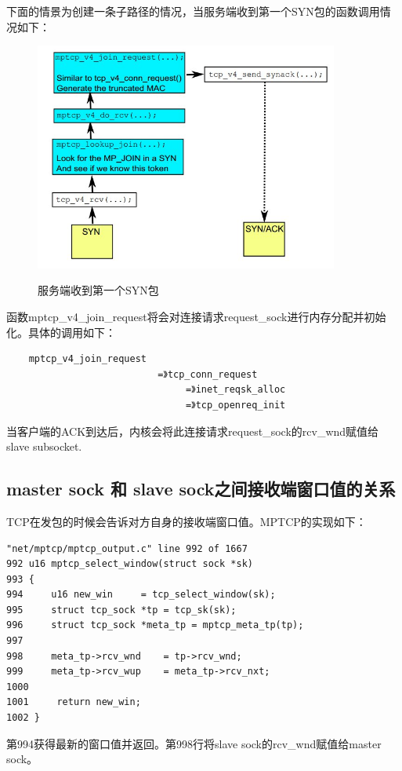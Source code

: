 下面的情景为创建一条子路径的情况，当服务端收到第一个SYN包的函数调用情况如下：
\begin{figure}
  \centering
  \includegraphics[width=10cm]{dias/Receive-first-SYN.jpg}\\
  \caption{服务端收到第一个SYN包}
\end{figure}
函数mptcp\_v4\_join\_request将会对连接请求request\_sock进行内存分配并初始化。具体的调用如下：
\small\begin{verbatim}
    mptcp_v4_join_request
                           =》tcp_conn_request
                                =》inet_reqsk_alloc
                                =》tcp_openreq_init
\end{verbatim}\normalsize
当客户端的ACK到达后，内核会将此连接请求request\_sock的rcv\_wnd赋值给slave subsocket.
\subsection{master sock 和 slave sock之间接收端窗口值的关系}
TCP在发包的时候会告诉对方自身的接收端窗口值。MPTCP的实现如下：
\small\begin{verbatim}
"net/mptcp/mptcp_output.c" line 992 of 1667
992 u16 mptcp_select_window(struct sock *sk)
993 {
994     u16 new_win     = tcp_select_window(sk);
995     struct tcp_sock *tp = tcp_sk(sk);
996     struct tcp_sock *meta_tp = mptcp_meta_tp(tp);
997
998     meta_tp->rcv_wnd    = tp->rcv_wnd;
999     meta_tp->rcv_wup    = meta_tp->rcv_nxt;
1000
1001     return new_win;
1002 }
\end{verbatim}\normalsize
第994获得最新的窗口值并返回。第998行将slave sock的rcv\_wnd赋值给master sock。


